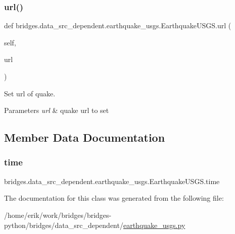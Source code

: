 \subsubsection{\texorpdfstring{url()}{url()}\hspace{0.1cm}{\footnotesize\ttfamily [2/2]}}
{\footnotesize\ttfamily def bridges.\+data\+\_\+src\+\_\+dependent.\+earthquake\+\_\+usgs.\+Earthquake\+U\+S\+G\+S.\+url (\begin{DoxyParamCaption}\item[{}]{self,  }\item[{}]{url }\end{DoxyParamCaption})}



Set url of quake. 


\begin{DoxyParams}{Parameters}
{\em url} & quake url to set \\
\hline
\end{DoxyParams}


\subsection{Member Data Documentation}
\mbox{\label{classbridges_1_1data__src__dependent_1_1earthquake__usgs_1_1_earthquake_u_s_g_s_aacc317fa18e83353df6c8ffb3d47d6c1}} 
\subsubsection{\texorpdfstring{time}{time}}
{\footnotesize\ttfamily bridges.\+data\+\_\+src\+\_\+dependent.\+earthquake\+\_\+usgs.\+Earthquake\+U\+S\+G\+S.\+time}



The documentation for this class was generated from the following file\+:\begin{DoxyCompactItemize}
\item 
/home/erik/work/bridges/bridges-\/python/bridges/data\+\_\+src\+\_\+dependent/\hyperlink{earthquake__usgs_8py}{earthquake\+\_\+usgs.\+py}\end{DoxyCompactItemize}

